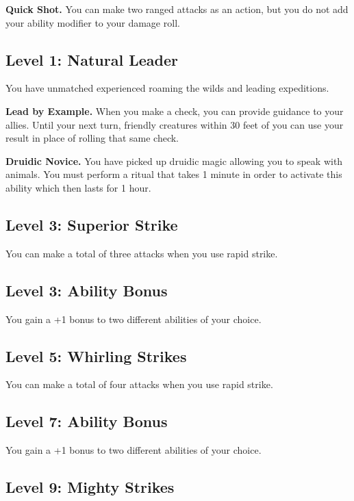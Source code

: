 \documentclass[12pt,letterpaper,twocolumn,openany,nodeprecatedcode,bg=none]{dndbook}
\let\oldsubsection\subsection
\renewcommand{\subsection}[1]{%
  \needspace{5\baselineskip}%
  \oldsubsection{#1}%
}
\begin{document}
\textbf{Quick Shot.} You can make two ranged attacks as an action, but
you do not add your ability modifier to your damage roll.

\subsection{Level 1: Natural Leader}\label{level-1-natural-leader}

You have unmatched experienced roaming the wilds and leading
expeditions.

\textbf{Lead by Example.} When you make a check, you can provide
guidance to your allies. Until your next turn, friendly creatures within
30 feet of you can use your result in place of rolling that same check.

\textbf{Druidic Novice.} You have picked up druidic magic allowing you
to speak with animals. You must perform a ritual that takes 1 minute in
order to activate this ability which then lasts for 1 hour.

\subsection{Level 3: Superior Strike}\label{level-3-superior-strike}

You can make a total of three attacks when you use rapid strike.

\subsection{Level 3: Ability Bonus}\label{level-3-ability-bonus}

You gain a +1 bonus to two different abilities of your choice.

\subsection{Level 5: Whirling Strikes}\label{level-5-whirling-strikes}

You can make a total of four attacks when you use rapid strike.

\subsection{Level 7: Ability Bonus}\label{level-7-ability-bonus}

You gain a +1 bonus to two different abilities of your choice.

\subsection{Level 9: Mighty Strikes}\label{level-9-mighty-strikes}
\end{document}
